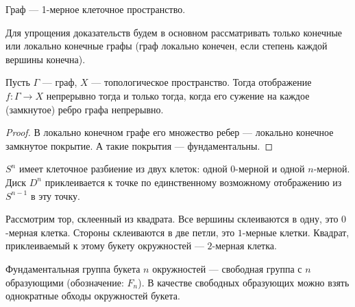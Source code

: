 \documentclass[12pt,a4paper]{article}
\begin{document}
    \begin{example}
        Граф --- 1-мерное клеточное пространство.
    \end{example}

    \begin{remark*}
        Для упрощения доказательств будем в основном рассматривать только конечные или локально конечные графы (граф локально конечен, если степень каждой вершины конечна).
    \end{remark*}

    \begin{theorem}
        Пусть $\Gamma$ --- граф, $X$ --- топологическое пространство. Тогда отображение $f: \Gamma \to X$ непрерывно тогда и только тогда, когда его сужение на каждое (замкнутое) ребро графа непрерывно.
    \end{theorem}

    \begin{proof}
        В локально конечном графе его множество ребер --- локально конечное замкнутое покрытие. А такие покрытия --- фундаментальны.
    \end{proof}

    \begin{example}
        $S^n$ имеет клеточное разбиение из двух клеток: одной $0$-мерной и одной $n$-мерной. Диск $D^n$ приклеивается к точке по единственному возможному отображению из $S^{n-1}$ в эту точку.
    \end{example}

    \begin{example}
        Рассмотрим тор, склеенный из квадрата. Все вершины склеиваются в одну, это $0$-мерная клетка. Стороны склеиваются в две петли, это $1$-мерные клетки. Квадрат, приклеиваемый к этому букету окружностей --- $2$-мерная клетка.
    \end{example}

    \begin{theorem}
        Фундаментальная группа букета $n$ окружностей --- свободная группа с $n$ образующими (обозначение: $F_n$). В качестве свободных образующих можно взять однократные обходы окружностей букета.
    \end{theorem}
\end{document}
